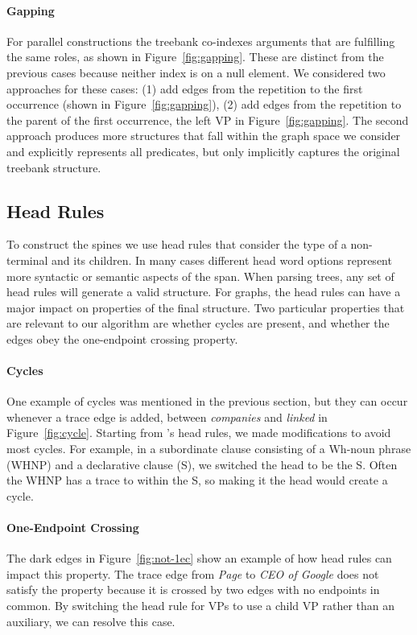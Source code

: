 \paragraph{Gapping}
For parallel constructions the treebank co-indexes arguments that are fulfilling the same roles, as shown in Figure~\ref{fig:gapping}.
These are distinct from the previous cases because neither index is on a null element.
We considered two approaches for these cases: (1) add edges from the repetition to the first occurrence (shown in Figure~\ref{fig:gapping}), (2) add edges from the repetition to the parent of the first occurrence, \myeg the left VP in Figure~\ref{fig:gapping}.
The second approach produces more structures that fall within the graph space we consider and explicitly represents all predicates, but only implicitly captures the original treebank structure.

\subsection{Head Rules} \label{sec:rep-head}

To construct the spines we use head rules that consider the type of a non-terminal and its children.
In many cases different head word options represent more syntactic or semantic aspects of the span.
When parsing trees, any set of head rules will generate a valid structure.
For graphs, the head rules can have a major impact on properties of the final structure.
Two particular properties that are relevant to our algorithm are whether cycles are present, and whether the edges obey the one-endpoint crossing property.

\paragraph{Cycles}
One example of cycles was mentioned in the previous section, but they can occur whenever a trace edge is added, \myeg between \emph{companies} and \emph{linked} in Figure~\ref{fig:cycle}.
Starting from \textcite{cck}'s head rules, we made modifications to avoid most cycles.
For example, in a subordinate clause consisting of a Wh-noun phrase (WHNP) and a declarative clause (S), we switched the head to be the S.
Often the WHNP has a trace to within the S, so making it the head would create a cycle.

\paragraph{One-Endpoint Crossing}
The dark edges in Figure~\ref{fig:not-1ec} show an example of how head rules can impact this property.
The trace edge from \emph{Page} to \emph{CEO of Google} does not satisfy the \oneEC property because it is crossed by two edges with no endpoints in common.
By switching the head rule for VPs to use a child VP rather than an auxiliary, we can resolve this case.

